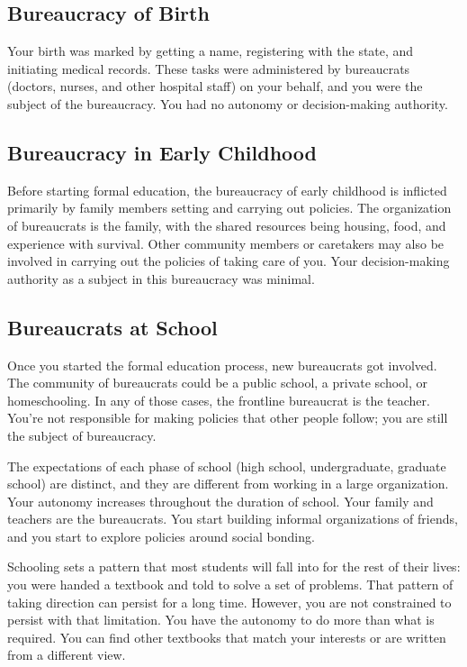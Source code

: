 \subsection*{Bureaucracy of Birth\label{sec:bureacracy-of-birth}}
Your birth was marked by getting a name, registering with the state, and initiating medical records. These tasks were administered by bureaucrats (doctors, nurses, and other hospital staff) on your behalf, and you were the subject of the bureaucracy. You had no autonomy or decision-making authority. 

\subsection*{Bureaucracy in Early Childhood\label{sec:bureaucracy-early-childhood}}
Before starting formal education, the bureaucracy of early childhood is inflicted primarily by family members setting and carrying out policies. The organization of bureaucrats is the family, with the shared resources being housing, food, and experience with survival. Other community members or caretakers may also be involved in carrying out the policies of taking care of you. Your decision-making authority as a subject in this bureaucracy was minimal. 

\subsection*{Bureaucrats at School\label{sec:bureaucracy-of-school}}
Once you started the formal education process, new bureaucrats got involved.  The community of bureaucrats could be a public school, a private school, or homeschooling. In any of those cases, the frontline bureaucrat is the teacher. You're not responsible for making policies that other people follow; you are still the subject of bureaucracy.


The expectations of each phase of school (high school, undergraduate, graduate school) are distinct, and they are different from working in a large organization. Your autonomy increases throughout the duration of school. %
Your family and teachers are the bureaucrats. You start building informal organizations of friends, and you start to explore policies around social bonding.

Schooling sets a pattern that most students will fall into for the rest of their lives: you were handed a textbook and told to solve a set of problems. That pattern of taking direction can persist for a long time. However, you are not constrained to persist with that limitation. You have the autonomy to do more than what is required. You can find other textbooks that match your interests or are written from a different view. 

